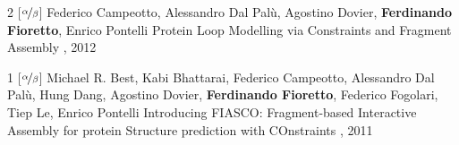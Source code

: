 \begin{pubs}
\wsentry
	{2} %
	{[$\nicefrac{\alpha}{\beta}$] Federico Campeotto, Alessandro Dal Pal\`{u}, Agostino Dovier, {\bf Ferdinando Fioretto}, Enrico Pontelli}
	{Protein Loop Modelling via Constraints and Fragment Assembly}
	{, 2012}
	{~} 

\wsentry 
	{1} %
	{[$\nicefrac{\alpha}{\beta}$] Michael R. Best, Kabi Bhattarai, Federico Campeotto, Alessandro Dal Pal\`{u}, Hung Dang, Agostino Dovier, {\bf Ferdinando Fioretto}, Federico Fogolari, Tiep Le, Enrico Pontelli}
	{Introducing FIASCO: Fragment-based Interactive Assembly for protein Structure prediction with COnstraints}
 	{, 2011}
  	{~}
\end{pubs}


